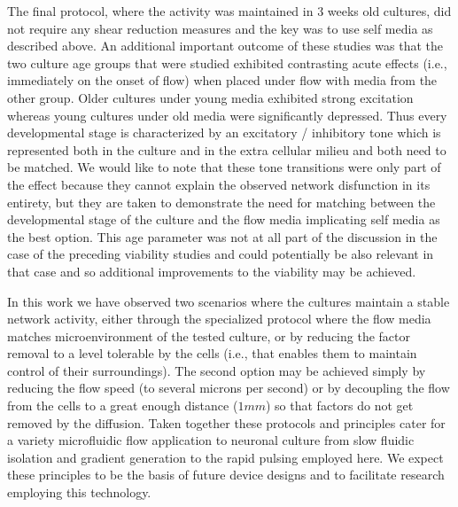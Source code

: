 The final protocol, where the activity was maintained in 3 weeks old cultures, did not require any shear reduction measures and the key was to use self media as described above. An additional important outcome of these studies was that the two culture age groups that were studied exhibited contrasting acute effects (i.e., immediately on the onset of flow) when placed under flow with media from the other group. Older cultures under young media exhibited strong excitation whereas young cultures under old media were significantly depressed. Thus every developmental stage is characterized by an excitatory / inhibitory tone which is represented both in the culture and in the extra cellular milieu and both need to be matched. We would like to note that these tone transitions were only part of the effect because they cannot explain the observed network disfunction in its entirety, but they are taken to demonstrate the need for matching between the developmental stage of the culture and the flow media implicating self media as the best option. This age parameter was not at all part of the discussion in the case of the preceding viability studies and could potentially be also relevant in that case and so additional improvements to the viability may be achieved.

In this work we have observed two scenarios where the cultures maintain a stable network activity, either through the specialized protocol where the flow media matches microenvironment of the tested culture, or by reducing the factor removal to a level tolerable by the cells (i.e., that enables them to maintain control of their surroundings). The second option may be achieved simply by reducing the flow speed (to several microns per second) or by decoupling the flow from the cells to a great enough distance (\(1mm\)) so that factors do not get removed by the diffusion. Taken together these protocols and principles cater for a variety microfluidic flow application to neuronal culture from slow fluidic isolation and gradient generation to the rapid pulsing employed here. We expect these principles to be the basis of future device designs and to facilitate research employing this technology.



